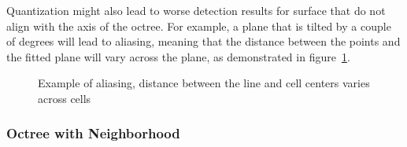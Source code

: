 Quantization might also lead to worse detection results for surface that do not align with the axis of the octree.
For example, a plane that is tilted by a couple of degrees will lead to aliasing,
meaning that the distance between the points and the fitted plane will vary across the plane, as demonstrated in figure~\ref{fig:aliasing}.
\vspace{0.1em}
\begin{figure}[h!]
    \centering
    \caption{Example of aliasing, distance between the line and cell centers varies across cells}
    \label{fig:aliasing}
\end{figure}

\subsubsection{Octree with Neighborhood}

